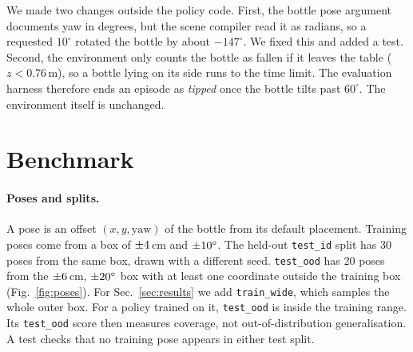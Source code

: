 \documentclass[10pt,twocolumn,letterpaper]{article}
\newcommand{\ttt}[1]{\texttt{\small #1}}
\begin{document}
We made two changes outside the policy code. First, the bottle pose argument documents yaw in degrees, but the
scene compiler read it as radians, so a requested $10^\circ$ rotated the bottle by about $-147^\circ$. We fixed
this and added a test. Second, the environment only counts the bottle as fallen if it leaves the table
($z<0.76$\,m), so a bottle lying on its side runs to the time limit. The evaluation harness therefore ends an
episode as \emph{tipped} once the bottle tilts past $60^\circ$. The environment itself is unchanged.

\section{Benchmark}\label{sec:bench}
\paragraph{Poses and splits.} A pose is an offset $(x, y, \text{yaw})$ of the bottle from its default
placement. Training poses come from a box of $\pm4$\,cm and $\pm10^\circ$. The held-out
\ttt{test\_id} split has 30 poses from the same box, drawn with a different seed. \ttt{test\_ood} has 20 poses
from the $\pm6$\,cm, $\pm20^\circ$ box with at least one coordinate outside the training box
(Fig.~\ref{fig:poses}). For Sec.~\ref{sec:results} we add \ttt{train\_wide}, which samples the whole outer box.
For a policy trained on it, \ttt{test\_ood} is inside the training range. Its \ttt{test\_ood} score then
measures coverage, not out-of-distribution generalisation. A test checks that no training pose appears in either
test split.
\end{document}

